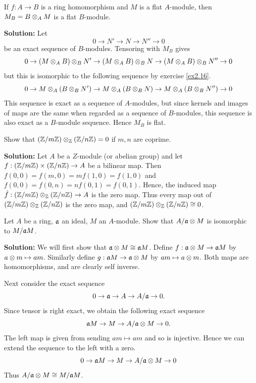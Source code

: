 \documentclass{article}
\begin{document}
\setcounter{exercise}{20}
\begin{exercise}
    If \(f : A \to B\) is a ring homomorphism and \(M\) is a flat \(A\)-module, then \(M_B = B \otimes_A M\) is a flat \(B\)-module.
\end{exercise}

\noindent\textbf{Solution:}
Let
\[
    0 \to N' \to N \to N'' \to 0
\]
be an exact sequence of \(B\)-modules.
Tensoring with \(M_B\) gives
\[
    0 \to (M \otimes_A B) \otimes_B N' \to (M \otimes_A B) \otimes_B N \to (M \otimes_A B) \otimes_B N'' \to 0
\]
but this is isomorphic to the following sequence by exercise \ref{ex2.16}.
\[
    0 \to M \otimes_A (B \otimes_B N') \to M \otimes_A (B \otimes_B N) \to M \otimes_A (B \otimes_B N'') \to 0
\]
This sequence is exact as a sequence of \(A\)-modules, but since kernels and images of maps are the same when regarded as a sequence of \(B\)-modules, this sequence is also exact as a \(B\)-module sequence.
Hence \(M_B\) is flat.

\setcounter{exercise}{0}
\renewcommand{\theexercise}{(\arabic{exercise})}

\begin{exercise}
    Show that \((\mathbb{Z}/m\mathbb{Z}) \otimes_{\mathbb{Z}} (\mathbb{Z}/n\mathbb{Z}) = 0\) if \(m, n\) are coprime.
\end{exercise}

\noindent\textbf{Solution:}
Let \(A\) be a \(Z\)-module (or abelian group) and let \(f : (\mathbb{Z}/m\mathbb{Z}) \times (\mathbb{Z}/n\mathbb{Z}) \to A\) be a bilinear map.
Then \(f(0, 0) = f(m, 0) = m f(1, 0) = f(1, 0)\) and \(f(0, 0) = f(0, n) = n f(0, 1) = f(0, 1)\).
Hence, the induced map \(\hat{f} : (\mathbb{Z}/m\mathbb{Z}) \otimes_{\mathbb{Z}} (\mathbb{Z}/n\mathbb{Z}) \to A\) is the zero map.
Thus every map out of \((\mathbb{Z}/m\mathbb{Z}) \otimes_{\mathbb{Z}} (\mathbb{Z}/n\mathbb{Z})\) is the zero map, and \((\mathbb{Z}/m\mathbb{Z}) \otimes_{\mathbb{Z}} (\mathbb{Z}/n\mathbb{Z}) \cong 0\).

\begin{exercise} \label{ex2-2}
    Let \(A\) be a ring, \(\mathfrak{a}\) an ideal, \(M\) an \(A\)-module.
    Show that \(A/\mathfrak{a} \otimes M\) is isomorphic to \(M/\mathfrak{a} M\).
\end{exercise}

\noindent\textbf{Solution:}
We will first show that \(\mathfrak{a} \otimes M \cong \mathfrak{a} M\).
Define \(f : \mathfrak{a} \otimes M \to \mathfrak{a} M\) by \(a \otimes m \mapsto am\).
Similarly define \(g : \mathfrak{a} M \to \mathfrak{a} \otimes M\) by \(am \mapsto a \otimes m\).
Both maps are homomorphisms, and are clearly self inverse.

Next consider the exact sequence
\[
    0 \to \mathfrak{a} \to A \to A/\mathfrak{a} \to 0.
\]
Since tensor is right exact, we obtain the following exact sequence
\[
    \mathfrak{a} M \to M \to A/\mathfrak{a} \otimes M \to 0.
\]
The left map is given from sending \(a m \mapsto a m\) and so is injective.
Hence we can extend the sequence to the left with a zero.
\[
    0 \to \mathfrak{a} M \to M \to A/\mathfrak{a} \otimes M \to 0
\]
Thus \(A/\mathfrak{a} \otimes M \cong M/\mathfrak{a} M\).
\end{document}
